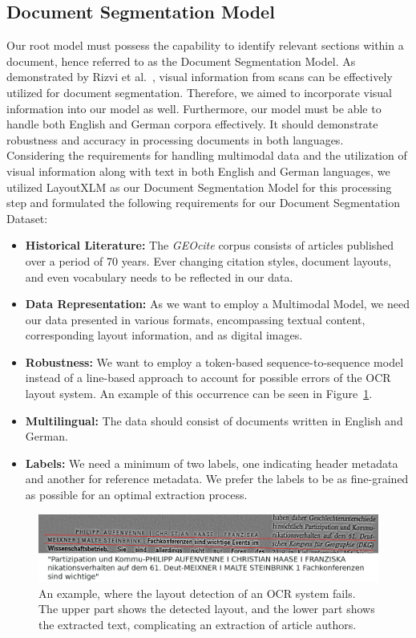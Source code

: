 \subsection{Document Segmentation Model}\label{sec:roadmap_docseg}
Our root model must possess the capability to identify relevant sections within a document, hence referred to as the Document Segmentation Model. As demonstrated by Rizvi et al.~\cite{rizvi2020hybrid}, visual information from scans can be effectively utilized for document segmentation. Therefore, we aimed to incorporate visual information into our model as well. Furthermore, our model must be able to handle both English and German corpora effectively. It should demonstrate robustness and accuracy in processing documents in both languages.\\
Considering the requirements for handling multimodal data and the utilization of visual information along with text in both English and German languages, we utilized LayoutXLM as our Document Segmentation Model for this processing step and formulated the following requirements for our Document Segmentation Dataset:
\begin{itemize}
    \item \textbf{Historical Literature:} The \textit{GEOcite} corpus consists of articles published over a period of 70 years. Ever changing citation styles, document layouts, and even vocabulary needs to be reflected in our data.
    \item \textbf{Data Representation:} As we want to employ a Multimodal Model, we need our data presented in various formats, encompassing textual content, corresponding layout information, and as digital images.
    \item \textbf{Robustness:} We want to employ a token-based sequence-to-sequence model instead of a line-based approach to account for possible errors of the OCR layout system. An example of this occurrence can be seen in Figure~\ref{fig:layout_error}.
    \item \textbf{Multilingual:} The data should consist of documents written in English and German.
    \item \textbf{Labels:} We need a minimum of two labels, one indicating header metadata and another for reference metadata. We prefer the labels to be as fine-grained as possible for an optimal extraction process.
\end{itemize}

\begin{figure}[!ht]
    \centering
    \includegraphics[width=1.0\linewidth]{images/layout_error.png}
    \caption{An example, where the layout detection of an OCR system fails. The upper part shows the detected layout, and the lower part shows the extracted text, complicating an extraction of article authors.}
    \label{fig:layout_error}
\end{figure}

